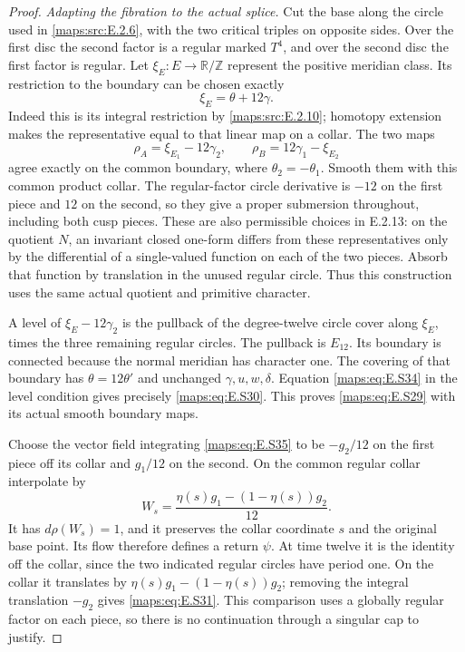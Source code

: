 \begin{proof}
\emph{Adapting the fibration to the actual splice.}
Cut the base along the circle used in \ref{maps:src:E.2.6}, with the two
critical triples on opposite sides. Over the first disc the
second factor is a regular marked $T^4$, and over the second
disc the first factor is regular. Let
$\xi_E:E\to\mathbb R/\mathbb Z$ represent the positive
meridian class. Its restriction to the boundary can be
chosen exactly
\[
                         \xi_E=\theta+12\gamma.
 \tag{E.S34}\label{maps:eq:E.S34}
\]
Indeed this is its integral restriction by \ref{maps:src:E.2.10}; homotopy
extension makes the representative equal to that linear
map on a collar. The two maps
\[
        \rho_A=\xi_{E_1}-12\gamma_2,
             \qquad \rho_B=12\gamma_1-\xi_{E_2}
 \tag{E.S35}\label{maps:eq:E.S35}
\]
agree exactly on the common boundary, where
$\theta_2=-\theta_1$. Smooth them with this common product
collar. The regular-factor circle derivative is $-12$ on
the first piece and $12$ on the second, so they give a
proper submersion throughout, including both cusp pieces.
These are also permissible choices in E.2.13: on the
quotient $N$, an invariant closed one-form differs from
these representatives only by the differential of a
single-valued function on each of the two pieces. Absorb
that function by translation in the unused regular circle.
Thus this construction uses the same actual quotient and
primitive character.

A level of $\xi_E-12\gamma_2$ is the pullback of the
degree-twelve circle cover along $\xi_E$, times the three
remaining regular circles. The pullback is $E_{12}$.
Its boundary is connected because the normal meridian has
character one. The covering of that boundary has
$\theta=12\theta'$ and unchanged $\gamma,u,w,\delta$.
Equation \eqref{maps:eq:E.S34} in the level condition gives precisely
\eqref{maps:eq:E.S30}. This proves \eqref{maps:eq:E.S29} with its actual smooth
boundary maps.

Choose the vector field integrating \eqref{maps:eq:E.S35} to be
$-g_2/12$ on the first piece off its collar and $g_1/12$
on the second. On the common regular collar interpolate by
\[
                     W_s=\frac{\eta(s)g_1-(1-\eta(s))g_2}{12}.
 \tag{E.S36}\label{maps:eq:E.S36}
\]
It has $d\rho(W_s)=1$, and it preserves the collar
coordinate $s$ and the original base point. Its flow
therefore defines a return $\psi$. At time twelve it is
the identity off the collar, since the two indicated
regular circles have period one. On the collar it
translates by $\eta(s)g_1-(1-\eta(s))g_2$; removing the
integral translation $-g_2$ gives \eqref{maps:eq:E.S31}. This comparison
uses a globally regular factor on each piece, so there
is no continuation through a singular cap to justify.


\end{proof}
